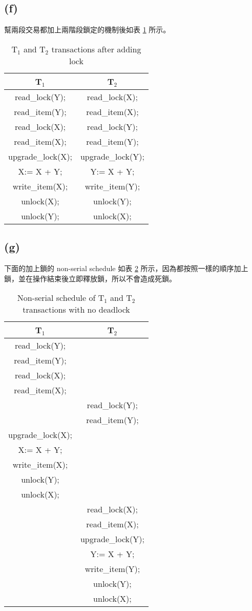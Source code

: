 \documentclass{article}
\begin{document}
\subsection*{(f)}
幫兩段交易都加上兩階段鎖定的機制後如表 \ref{tab:2_f} 所示。
\begin{table}[H]
    \centering
    \begin{tabular}{|c|c|}
    \toprule
    \textbf{T$_1$} & \textbf{T$_2$} \\
    \midrule
    read\_lock(Y); & read\_lock(X); \\
    read\_item(Y); & read\_item(X); \\
    read\_lock(X); & read\_lock(Y); \\
    read\_item(X); & read\_item(Y); \\
    upgrade\_lock(X); & upgrade\_lock(Y); \\
    X:= X + Y; & Y:= X + Y; \\
    write\_item(X); & write\_item(Y); \\
    unlock(X); & unlock(Y); \\
    unlock(Y); & unlock(X); \\
    \bottomrule
    \end{tabular}
    \caption{T$_1$ and T$_2$ transactions after adding lock}
    \label{tab:2_f}
\end{table}

\subsection*{(g)}
下面的加上鎖的 non-serial schedule 如表 \ref{tab:2_g} 所示，因為都按照一樣的順序加上鎖，並在操作結束後立即釋放鎖，所以不會造成死鎖。
\begin{table}[H]
    \centering
    \begin{tabular}{|c|c|}
    \toprule
    \textbf{T$_1$} & \textbf{T$_2$} \\
    \midrule
    read\_lock(Y); & \\
    read\_item(Y); & \\
    read\_lock(X); & \\
    read\_item(X); & \\
    & read\_lock(Y); \\
    & read\_item(Y); \\
    upgrade\_lock(X); & \\
    X:= X + Y; &  \\
    write\_item(X); & \\
    unlock(Y); & \\
    unlock(X); & \\
    & read\_lock(X); \\
    & read\_item(X); \\
    & upgrade\_lock(Y); \\
    & Y:= X + Y; \\
    & write\_item(Y); \\
    & unlock(Y); \\
    & unlock(X); \\
    \bottomrule
    \end{tabular}
    \caption{Non-serial schedule of T$_1$ and T$_2$ transactions with no deadlock} 
    \label{tab:2_g}
\end{table}
\end{document}
